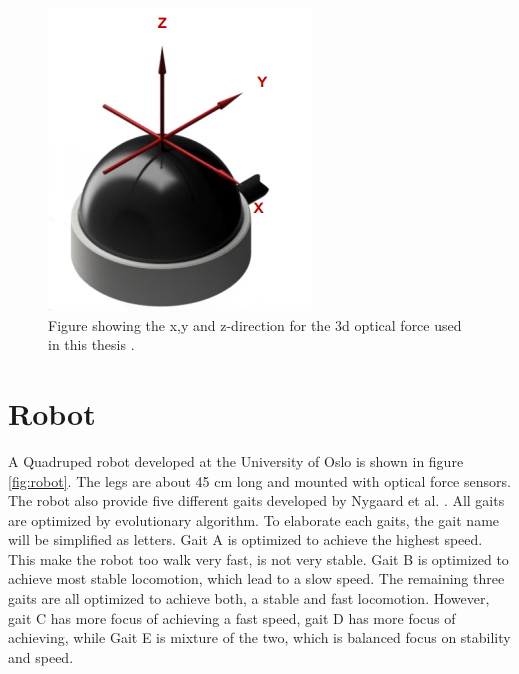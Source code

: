 \documentclass[USenglish]{ifimaster}  %
\begin{document}
\begin{figure}[h]
	\centering
	\includegraphics[scale=0.8]{Figures/OptoforceAxis3}
	\caption{Figure showing the x,y and z-direction for the 3d optical force used in this thesis \cite{OptoforceSheet}.}
	\label{fig:OptoforceAxis}
\end{figure}

\section{Robot} \label{sec:robot}
A Quadruped robot developed at the University of Oslo is shown in figure \ref{fig:robot}. The legs are about 45 cm long and mounted with optical force sensors. The robot also provide five different gaits developed by Nygaard et al. \cite{7850167}. All gaits are optimized by evolutionary algorithm. To elaborate each gaits, the gait name will be simplified as letters. Gait A is optimized to achieve the highest speed. This make the robot too walk very fast, is not very stable. Gait B is optimized to achieve most stable locomotion, which lead to a slow speed. The remaining three gaits are all optimized to achieve both, a stable and fast locomotion. However, gait C has more focus of achieving a fast speed, gait D has more focus of achieving, while Gait E is mixture of the two, which is balanced focus on stability and speed. 
\end{document}
